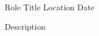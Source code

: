 

\begin{cventries}

  \cventry
    {Role} %
    {Title} %
    {Location} %
    {Date} %
    {
      \begin{cvitems} %
        \item {Description}
      \end{cvitems}
    }

\end{cventries}
